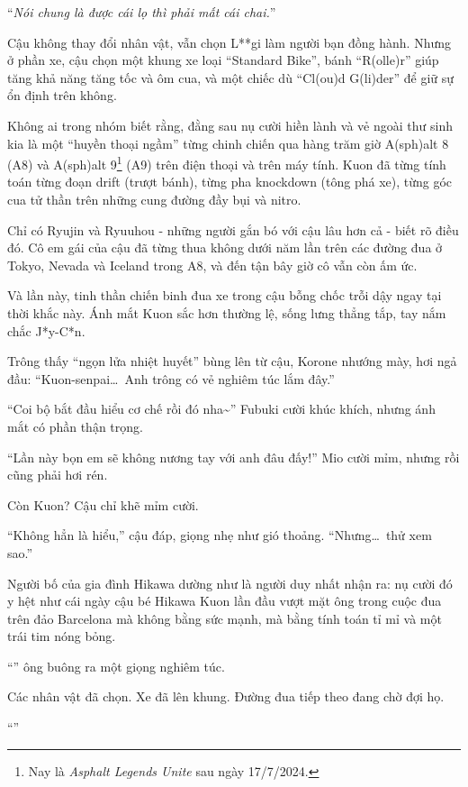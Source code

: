 \documentclass[../main.tex]{subfiles}
\begin{document}
``\textit{Nói chung là được cái lọ thì phải mất cái chai.}''

Cậu không thay đổi nhân vật, vẫn chọn L**gi làm người bạn đồng hành. Nhưng ở phần xe, cậu chọn một khung xe loại ``Standard Bike'', bánh ``R(olle)r'' giúp tăng khả năng tăng tốc và ôm cua, và một chiếc dù ``Cl(ou)d G(li)der'' để giữ sự ổn định trên không.

Không ai trong nhóm biết rằng, đằng sau nụ cười hiền lành và vẻ ngoài thư sinh kia là một ``huyền thoại ngầm'' từng chinh chiến qua hàng trăm giờ A(sph)alt 8 (A8) và A(sph)alt 9\footnote{Nay là \textit{Asphalt Legends Unite} sau ngày 17/7/2024.} (A9) trên điện thoại và trên máy tính. Kuon đã từng tính toán từng đoạn drift (trượt bánh), từng pha knockdown (tông phá xe), từng góc cua tử thần trên những cung đường đầy bụi và nitro.

Chỉ có Ryujin và Ryuuhou - những người gắn bó với cậu lâu hơn cả - biết rõ điều đó. Cô em gái của cậu đã từng thua không dưới năm lần trên các đường đua ở Tokyo, Nevada và Iceland trong A8, và đến tận bây giờ cô vẫn còn ấm ức.

Và lần này, tinh thần chiến binh đua xe trong cậu bỗng chốc trỗi dậy ngay tại thời khắc này. Ánh mắt Kuon sắc hơn thường lệ, sống lưng thẳng tắp, tay nắm chắc J*y-C*n.

Trông thấy ``ngọn lửa nhiệt huyết'' bùng lên từ cậu, Korone nhướng mày, hơi ngả đầu: ``Kuon-senpai\dots\ Anh trông có vẻ nghiêm túc lắm đây.''

``Coi bộ bắt đầu hiểu cơ chế rồi đó nha\~{}'' Fubuki cười khúc khích, nhưng ánh mắt có phần thận trọng.

``Lần này bọn em sẽ không nương tay với anh đâu đấy!'' Mio cười mỉm, nhưng rồi cũng phải hơi rén.

Còn Kuon? Cậu chỉ khẽ mỉm cười.

``Không hẳn là hiểu,'' cậu đáp, giọng nhẹ như gió thoảng. ``Nhưng\dots\ thử xem sao.''

Người bố của gia đình Hikawa dường như là người duy nhất nhận ra: nụ cười đó y hệt như cái ngày cậu bé Hikawa Kuon lần đầu vượt mặt ông trong cuộc đua trên đảo Barcelona mà không bằng sức mạnh, mà bằng tính toán tỉ mỉ và một trái tim nóng bỏng.

``'' ông buông ra một giọng nghiêm túc.

Các nhân vật đã chọn. Xe đã lên khung. Đường đua tiếp theo đang chờ đợi họ.

``''
\end{document}
